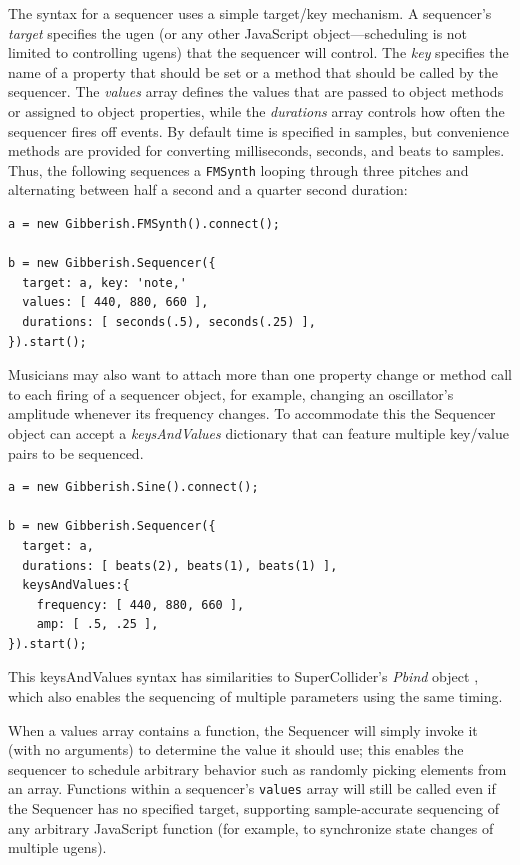 The syntax for a sequencer uses a simple target/key mechanism. A sequencer's \emph{target} specifies the ugen (or any other JavaScript object---scheduling is not limited to controlling ugens) that the sequencer will control. The \emph{key} specifies the name of a property that should be set or a method that should be called by the sequencer. The \emph{values} array defines the values that are passed to object methods or assigned to object properties, while the \emph{durations} array controls how often the sequencer fires off events. By default time is specified in samples, but convenience methods are provided for converting milliseconds, seconds, and beats to samples. Thus, the following sequences a \texttt{FMSynth} looping through three pitches and alternating between half a second and a quarter second duration:

{\small {\begin{verbatim}
a = new Gibberish.FMSynth().connect();

b = new Gibberish.Sequencer({
  target: a, key: 'note,'
  values: [ 440, 880, 660 ],
  durations: [ seconds(.5), seconds(.25) ],
}).start();
\end{verbatim}}}

Musicians may also want to attach more than one property change or method call to each firing of a sequencer object, for example,  changing an oscillator's amplitude whenever its frequency changes. To accommodate this the Sequencer object can accept a \emph{keysAndValues} dictionary that can feature multiple key/value pairs to be sequenced.

{\small {\begin{verbatim}
a = new Gibberish.Sine().connect();

b = new Gibberish.Sequencer({
  target: a,
  durations: [ beats(2), beats(1), beats(1) ],
  keysAndValues:{
    frequency: [ 440, 880, 660 ],
    amp: [ .5, .25 ],
}).start();
\end{verbatim}}}

This keysAndValues syntax has similarities to SuperCollider's \emph{Pbind} object \cite{Kuivila:2011}, which also enables the sequencing of multiple parameters using the same timing. 

When a values array contains a function, the Sequencer will simply invoke it (with no arguments) to determine the value it should use; this enables the sequencer to schedule arbitrary behavior such as randomly picking elements from an array.  Functions within a sequencer's \texttt{values} array will still be called even if the Sequencer has no specified target, supporting sample-accurate sequencing of any arbitrary JavaScript function (for example, to synchronize state changes of multiple ugens).

